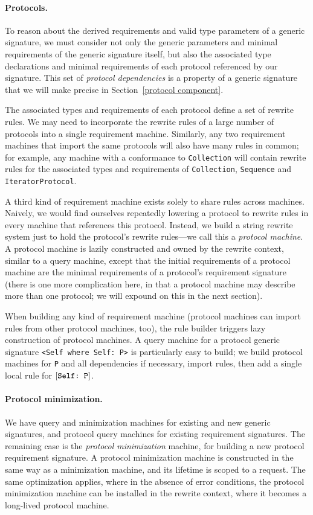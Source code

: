 \documentclass[../generics]{subfiles}
\begin{document}
\paragraph{Protocols.}
To reason about the derived requirements and valid type parameters of a generic signature, we must consider not only the generic parameters and minimal requirements of the generic signature itself, but also the associated type declarations and minimal requirements of each protocol referenced by our signature. This set of \emph{protocol dependencies} is a property of a generic signature that we will make precise in Section~\ref{protocol component}.

The associated types and requirements of each protocol define a set of rewrite rules. We may need to incorporate the rewrite rules of a large number of protocols into a single requirement machine. Similarly, any two requirement machines that import the same protocols will also have many rules in common; for example, any machine with a conformance to \texttt{Collection} will contain rewrite rules for the associated types and requirements of \texttt{Collection}, \texttt{Sequence} and \texttt{IteratorProtocol}.

A third kind of requirement machine exists solely to share rules across machines. Naively, we would find ourselves repeatedly lowering a protocol to rewrite rules in every machine that references this protocol. Instead, we build a string rewrite system just to hold the protocol's rewrite rules---we call this a \emph{protocol machine}. A protocol machine is lazily constructed and owned by the rewrite context, similar to a query machine, except that the initial requirements of a protocol machine are the minimal requirements of a protocol's requirement signature (there is one more complication here, in that a protocol machine may describe more than one protocol; we will expound on this in the next section).

When building any kind of requirement machine (protocol machines can import rules from other protocol machines, too), the rule builder triggers lazy construction of protocol machines. A query machine for a protocol generic signature \verb|<Self where Self: P>| is particularly easy to build; we build protocol machines for \texttt{P} and all dependencies if necessary, import rules, then add a single local rule for $[\texttt{Self:~P}]$.

\paragraph{Protocol minimization.}
We have query and minimization machines for existing and new generic signatures, and protocol query machines for existing requirement signatures. The remaining case is the \emph{protocol minimization} machine, for building a new protocol requirement signature. A protocol minimization machine is constructed in the same way as a minimization machine, and its lifetime is scoped to a request. The same optimization applies, where in the absence of error conditions, the protocol minimization machine can be installed in the rewrite context, where it becomes a long-lived protocol machine.
\end{document}
